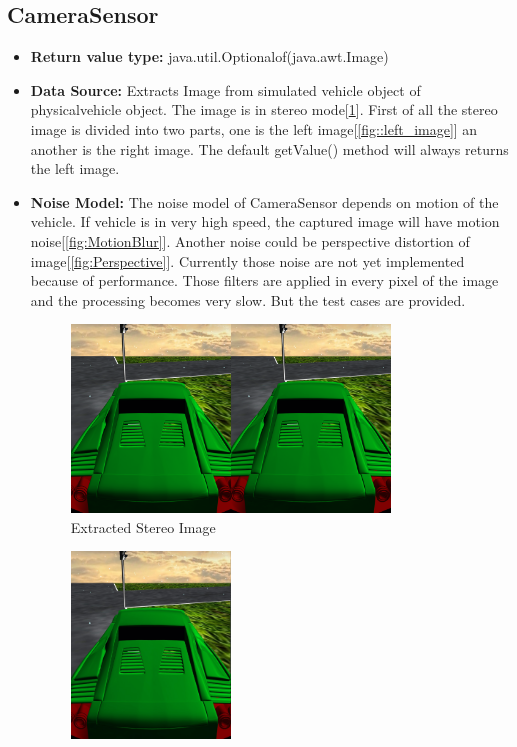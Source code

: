 \documentclass[]{article}
\begin{document}
    \subsection{CameraSensor}
        \begin{itemize}
        \item \textbf{Return value type:} java.util.Optionalof(java.awt.Image)
        \item \textbf{Data Source:} Extracts Image from simulated vehicle object of physicalvehicle object. The image is in stereo mode[\ref{fig::stereo}]. First of all the stereo image is divided into two parts, one is the left image[\ref{fig::left_image}] an another is the right image. The default getValue() method will always returns the left image.
        \item \textbf{Noise Model:} The noise model of CameraSensor depends on motion of the vehicle. If vehicle is in very high speed, the captured image will have motion noise[\ref{fig:MotionBlur}]. Another noise could be perspective distortion of image[\ref{fig:Perspective}]. Currently those noise are not yet implemented because of performance. Those filters are applied in every pixel of the image and the processing becomes very slow. But the test cases are provided.
            \begin{figure}[H]
            	\centering
            	\includegraphics[width=0.8\textwidth]{Stereo_Image.jpg}
            	\caption{Extracted Stereo Image}
            	\label{fig::stereo}
            \end{figure}
            \begin{figure}[H]
            	\centering
            	\includegraphics[width=0.4\textwidth]{left_Image.jpg}

\end{figure}
\end{itemize}
\end{document}
